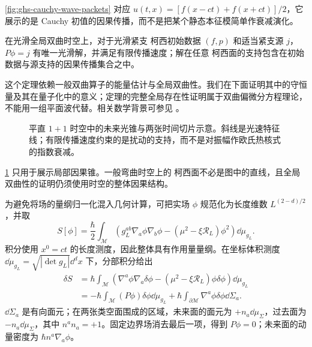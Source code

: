 \cref{fig:ghs-cauchy-wave-packets} 对应 $u(t,x)=[f(x-ct)+f(x+ct)]/2$，它展示的是 Cauchy 初值的因果传播，而不是把某个静态本征模简单作衰减演化。

\begin{theorem}[双曲 柯西问题]\label{thm:ghs-r6-cauchy-wellposed}
在光滑全局双曲时空上，对于光滑紧支 柯西初始数据 $(f,p)$ 和适当紧支源 $j$，$P\phi=j$ 有唯一光滑解，并满足有限传播速度；解在任意 柯西面的支持包含在初始数据与源支持的因果传播集合之中。
\end{theorem}
这个定理依赖一般双曲算子的能量估计与全局双曲性。我们在下面证明其中的守恒量及其在量子化中的意义；定理的完整全局存在性证明属于双曲偏微分方程理论，不能用一组平面波代替。相关数学背景可参见 \cite{ghs-r6-baer-wave}。

\begin{figure}[htbp]
\centering

\caption{平直 $1+1$ 时空中的未来光锥与两张时间切片示意。斜线是光速特征线；有限传播速度约束的是扰动的支持，而不是对振幅作欧氏热核式的指数衰减。}\label{fig:ghs-causal-domain}
\end{figure}

\cref{fig:ghs-causal-domain} 只用于展示局部因果锥。一般弯曲时空上的 柯西面不必是图中的直线，且全局双曲性的证明仍须使用时空的整体因果结构。


为避免将场的量纲归一化混入几何计算，可把实场 $\phi$ 规范化为长度维数 $L^{(2-d)/2}$，并取
\begin{equation}\label{eq:ghs-r6-kg-action}
S[\phi]=\frac{\hbar}{2}\int_{\mathcal M}
\left(g_L^{ab}\nabla_a\phi\nabla_b\phi-(\mu^2-\xi\mathcal R_L)\phi^2\right)\dd\mu_{g_L}.
\end{equation}
积分使用 $x^0=ct$ 的长度测度，因此整体具有作用量量纲。在坐标体积测度 $\dd\mu_{g_L}=\sqrt{|\det g_L|}\dd^dx$ 下，分部积分给出
\begin{align*}
\delta S
&=\hbar\int_{\mathcal M}\left(\nabla^a\phi\nabla_a\delta\phi-(\mu^2-\xi\mathcal R_L)\phi\delta\phi\right)\dd\mu_{g_L}\\
&=-\hbar\int_{\mathcal M}(P\phi)\delta\phi\dd\mu_{g_L}
 +\hbar\int_{\partial\mathcal M}\nabla^a\phi\delta\phi\dd\Sigma_a.
\end{align*}
$\dd\Sigma_a$ 是有向面元；在两张类空面围成的区域，未来面的面元为 $+n_a\dd\mu_\Sigma$，过去面为 $-n_a\dd\mu_\Sigma$，其中 $n^an_a=+1$。固定边界场消去最后一项，得到 $P\phi=0$；未来面的动量密度为 $\hbar n^a\nabla_a\phi$。

